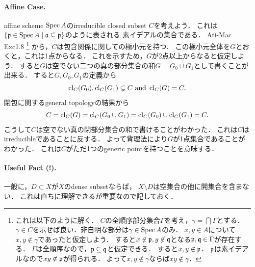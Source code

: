 \documentclass[a4paper]{jsarticle}
\begin{document}
    \paragraph{Affine Case.}
    affine scheme $\operatorname{Spec} A$のirreducible closed subset $C$を考えよう．
    これは$\{ \mathfrak{p} \in \operatorname{Spec} A \mid \mathfrak{a} \subseteq \mathfrak{p} \}$のように表される
    素イデアルの集合である．
    Ati-Mac Exc1.8
    \footnote
    {
        これは以下のように解く．
        $C$の全順序部分集合$\Gamma$を考え，$\gamma=\bigcap \Gamma$とする．
        $\gamma \in C$を示せば良い．非自明な部分は$\gamma \in \operatorname{Spec} A$のみ．
        $x, y \in A$について$x, y \not \in \gamma$であったと仮定しよう．
        すると$x \not \in \mathfrak{p}, y \not \in \mathfrak{q}$となる$\mathfrak{p}, \mathfrak{q} \in \Gamma$が存在する．
        $\Gamma$は全順序なので，$\mathfrak{p} \subseteq \mathfrak{q}$と仮定できる．
        すると$x,y \not \in \mathfrak{p}$．
        $\mathfrak{p}$は素イデアルなので$xy \not \in \mathfrak{p}$が得られる．
        よって$x, y \not \in \gamma$ならば$xy \not \in \gamma$．
    }
    から，$C$は包含関係に関しての極小元を持つ．
    この極小元全体を$G$とおくと，これは1点からなる．
    これを示すため，$G$が2点以上からなると仮定しよう．
    すると$G$は空でない二つの真の部分集合の和$G=G_0 \cup G_1$として書くことが出来る．
    すると$G, G_0, G_1$の定義から
    \[ \operatorname{cl}_C(G_0), \operatorname{cl}_C(G_1) \subsetneq C \text{ and } \operatorname{cl}_C(G)=C. \]
    閉包に関するgeneral topologyの結果から
    \[ C=\operatorname{cl}_C(G)=\operatorname{cl}_C(G_0 \cup G_1)=\operatorname{cl}_C(G_0) \cup \operatorname{cl}_C(G_1)=C. \]
    こうして$C$は空でない真の閉部分集合の和で書けることがわかった．
    これは$C$はirreducibleであることに反する．
    よって背理法により$G$が1点集合であることがわかった．
    これは$C$がただ1つのgeneric pointを持つことを意味する．

    \paragraph{Useful Fact (!).}
    一般に，$D \subset X$が$X$のdense subsetならば，
    $X \setminus D$は空集合の他に開集合を含まない．
    これは直ちに理解できるが重要なので記しておく．
\end{document}
